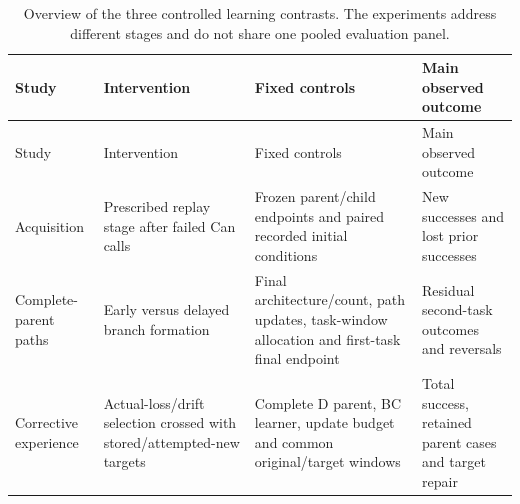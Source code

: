 \documentclass[10pt,letterpaper]{article}
\begin{document}
\begin{longtable}[]{@{}
  >{\raggedright\arraybackslash}p{}
  >{\raggedright\arraybackslash}p{}
  >{\raggedright\arraybackslash}p{}
  >{\raggedright\arraybackslash}p{}@{}}
\caption{Overview of the three controlled learning contrasts. The
experiments address different stages and do not share one pooled
evaluation panel.}\tabularnewline
\toprule\noalign{}
\begin{minipage}[b]{\linewidth}\raggedright
Study
\end{minipage} & \begin{minipage}[b]{\linewidth}\raggedright
Intervention
\end{minipage} & \begin{minipage}[b]{\linewidth}\raggedright
Fixed controls
\end{minipage} & \begin{minipage}[b]{\linewidth}\raggedright
Main observed outcome
\end{minipage} \\
\midrule\noalign{}
\endfirsthead
\toprule\noalign{}
\begin{minipage}[b]{\linewidth}\raggedright
Study
\end{minipage} & \begin{minipage}[b]{\linewidth}\raggedright
Intervention
\end{minipage} & \begin{minipage}[b]{\linewidth}\raggedright
Fixed controls
\end{minipage} & \begin{minipage}[b]{\linewidth}\raggedright
Main observed outcome
\end{minipage} \\
\midrule\noalign{}
\endhead
\bottomrule\noalign{}
\endlastfoot
Acquisition & Prescribed replay stage after failed Can calls & Frozen
parent/child endpoints and paired recorded initial conditions & New
successes and lost prior successes \\
Complete-parent paths & Early versus delayed branch formation & Final
architecture/count, path updates, task-window allocation and first-task
final endpoint & Residual second-task outcomes and reversals \\
Corrective experience & Actual-loss/drift selection crossed with
stored/attempted-new targets & Complete D parent, BC learner, update
budget and common original/target windows & Total success, retained
parent cases and target repair \\
\end{longtable}
\end{document}

